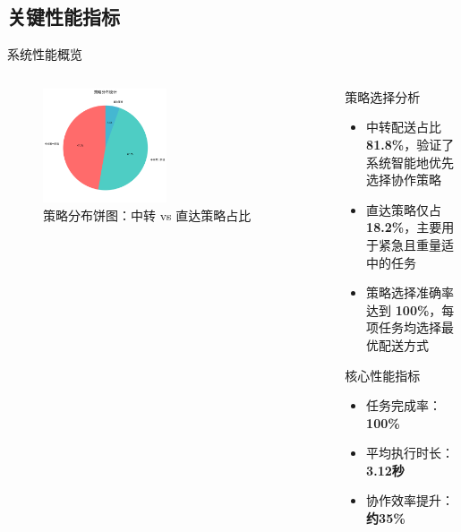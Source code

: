 \documentclass[
10pt,
aspectratio=169,
]{beamer}
\begin{document}
\subsection{关键性能指标}

\begin{frame}{系统性能概览}
    \begin{columns}
        \begin{column}{0.6\textwidth}
            \begin{figure}
                \centering
                \includegraphics[width=0.5\textwidth]{analysis_results/strategy_distribution_20250617_081450.png}
                \caption{策略分布饼图：中转 vs 直达策略占比}
            \end{figure}
        \end{column}
        \begin{column}{0.4\textwidth}
            \begin{alertblock}{策略选择分析}
                \begin{itemize}
                    \item 中转配送占比 \textbf{81.8\%}，验证了系统智能地优先选择协作策略
                    \item 直达策略仅占 \textbf{18.2\%}，主要用于紧急且重量适中的任务
                    \item 策略选择准确率达到 \textbf{100\%}，每项任务均选择最优配送方式
                \end{itemize}
            \end{alertblock}
            
            \begin{exampleblock}{核心性能指标}
                \begin{itemize}
                    \item 任务完成率：\textbf{100\%}
                    \item 平均执行时长：\textbf{3.12秒}
                    \item 协作效率提升：\textbf{约35\%}
                \end{itemize}
            \end{exampleblock}
        \end{column}
    \end{columns}
\end{frame}
\end{document}
